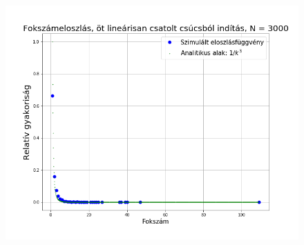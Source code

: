 \documentclass[a4paper, 12pt]{article}
\numberwithin{equation}{section}          %
\numberwithin{figure}{subsection}
\begin{document}
\clearpage
\begin{figure}[c!]
	\begin{center}
		\includegraphics[width=1\textwidth]{masodik.png}
	\end{center}
\end{figure}

\clearpage
\end{document}
